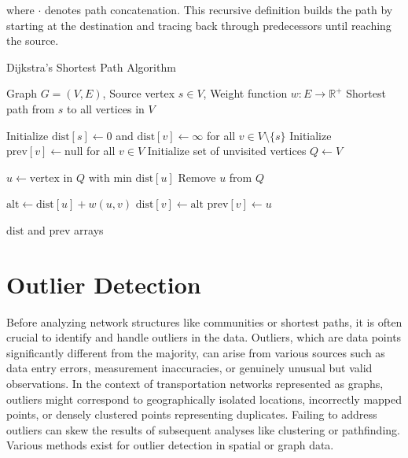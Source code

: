 where $\cdot$ denotes path concatenation. This recursive definition builds the path by starting at the destination and tracing back through predecessors until reaching the source.

\begin{algorithm}[H]
\caption{Dijkstra's Shortest Path Algorithm}
\label{alg:dijkstra}
\begin{algorithmic}[1]
\Require Graph $G = (V, E)$, Source vertex $s \in V$, Weight function $w: E \rightarrow \mathbb{R}^+$
\Ensure Shortest path from $s$ to all vertices in $V$

\State Initialize $\text{dist}[s] \gets 0$ and $\text{dist}[v] \gets \infty$ for all $v \in V \setminus \{s\}$
\State Initialize $\text{prev}[v] \gets \text{null}$ for all $v \in V$
\State Initialize set of unvisited vertices $Q \gets V$

    \State $u \gets \text{vertex in } Q \text{ with min } \text{dist}[u]$ 
    \State Remove $u$ from $Q$
    
        \State $\text{alt} \gets \text{dist}[u] + w(u, v)$ 
            \State $\text{dist}[v] \gets \text{alt}$ 
            \State $\text{prev}[v] \gets u$ 
        \EndIf
    \EndFor
\EndWhile

\State \Return $\text{dist}$ and $\text{prev}$ arrays
\end{algorithmic}
\end{algorithm}

\section{Outlier Detection}
\label{se:OutlierDetection}

Before analyzing network structures like communities or shortest paths, it is often crucial to identify and handle outliers in the data. Outliers, which are data points significantly different from the majority, can arise from various sources such as data entry errors, measurement inaccuracies, or genuinely unusual but valid observations. In the context of transportation networks represented as graphs, outliers might correspond to geographically isolated locations, incorrectly mapped points, or densely clustered points representing duplicates. Failing to address outliers can skew the results of subsequent analyses like clustering or pathfinding. Various methods exist for outlier detection in spatial or graph data.

